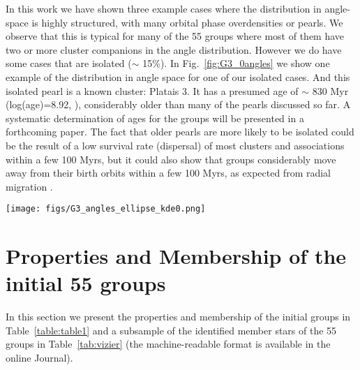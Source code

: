 \documentclass[twocolumn]{aastex631}
\begin{document}
In this work we have shown three example cases where the distribution in angle-space is highly structured, with many orbital phase overdensities or pearls. We observe that this is typical for many of the 55 groups where most of them have two or more cluster companions in the angle distribution. However we do have some cases that are isolated ($\sim$ 15\%). In Fig.~\ref{fig:G3_0angles} we show one example of the distribution in angle space for one of our isolated cases. And this isolated pearl is a known cluster: Platais 3. It has a presumed age of $\sim$ 830 Myr (log(age)=8.92, \citet{2018A&A...615A..12Y}), considerably older than many of the pearls discussed so far. A systematic determination of ages for the groups will be presented in a forthcoming paper. The fact that older pearls are more likely to be isolated could be the result of a low survival rate (dispersal) of most clusters and associations within a few 100 Myrs, but it could also show that groups considerably move away from their birth orbits within a few 100 Myrs, as expected from radial migration \citep{2018ApJ...865...96F}.

\begin{figure*}
\begin{center}
\texttt{[image: figs/G3\_angles\_ellipse\_kde0.png]}
\caption{2D projected kernel density maps of the angle distribution ($\theta_{R}, \theta_{z}, \theta_{\phi}$) of the stars enclosed by the orbit patch of one isolated cluster example.
This pearl located at ($\theta_{R}, \theta_{z}, \theta_{\phi})\,\rm(deg) \sim (60,80,-3)$  actually corresponds to a known cluster: Platais 3. The lower panel shows the smooth-phase mixed distribution that reproduces the main trends of the dataset where we don't see the cluster.}
\label{fig:G3_0angles}
\end{center}
\end{figure*}


\section{Properties and Membership of the initial 55 groups}
In this section we present the properties and membership of the initial groups in Table~\ref{table:table1} and a subsample of the identified member stars of the 55 groups in Table~\ref{tab:vizier} (the machine-readable format is available in the online Journal).
\end{document}
